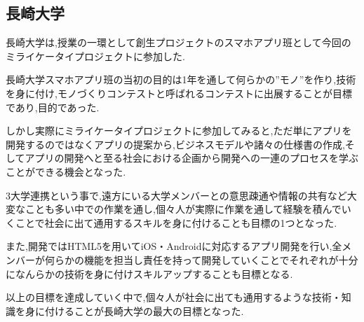 \subsection{長崎大学}
\par
長崎大学は,授業の一環として創生プロジェクトのスマホアプリ班として今回のミライケータイプロジェクトに参加した.
\par
長崎大学スマホアプリ班の当初の目的は1年を通して何らかの”モノ”を作り,技術を身に付け,モノづくりコンテストと呼ばれるコンテストに出展することが目標であり,目的であった.
\par
しかし実際にミライケータイプロジェクトに参加してみると,ただ単にアプリを開発するのではなくアプリの提案から,ビジネスモデルや諸々の仕様書の作成,そしてアプリの開発へと至る社会における企画から開発への一連のプロセスを学ぶことができる機会となった.
\par
3大学連携という事で,遠方にいる大学メンバーとの意思疎通や情報の共有など大変なことも多い中での作業を通し,個々人が実際に作業を通して経験を積んでいくことで社会に出て通用するスキルを身に付けることも目標の1つとなった.
\par
また,開発ではHTML5を用いてiOS・Androidに対応するアプリ開発を行い,全メンバーが何らかの機能を担当し責任を持って開発していくことでそれぞれが十分になんらかの技術を身に付けスキルアップすることも目標となる.
\par
以上の目標を達成していく中で,個々人が社会に出ても通用するような技術・知識を身に付けることが長崎大学の最大の目標となった.
